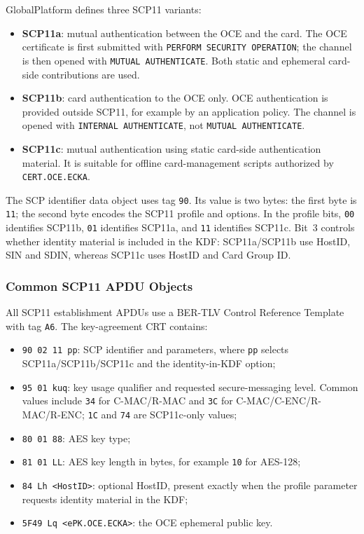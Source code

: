 GlobalPlatform defines three SCP11 variants:
\begin{itemize}
\item \textbf{SCP11a}: mutual authentication between the OCE and the card.
      The OCE certificate is first submitted with
      \texttt{PERFORM SECURITY OPERATION}; the channel is then opened with
      \texttt{MUTUAL AUTHENTICATE}. Both static and ephemeral card-side
      contributions are used.
\item \textbf{SCP11b}: card authentication to the OCE only. OCE
      authentication is provided outside SCP11, for example by an application
      policy. The channel is opened with \texttt{INTERNAL AUTHENTICATE}, not
      \texttt{MUTUAL AUTHENTICATE}.
\item \textbf{SCP11c}: mutual authentication using static card-side
      authentication material. It is suitable for offline card-management
      scripts authorized by \texttt{CERT.OCE.ECKA}.
\end{itemize}

The SCP identifier data object uses tag \texttt{90}. Its value is two bytes:
the first byte is \texttt{11}; the second byte encodes the SCP11 profile and
options. In the profile bits, \texttt{00} identifies SCP11b, \texttt{01}
identifies SCP11a, and \texttt{11} identifies SCP11c. Bit~3 controls whether
identity material is included in the KDF: SCP11a/SCP11b use HostID, SIN and
SDIN, whereas SCP11c uses HostID and Card Group ID.

\subsubsection{Common SCP11 APDU Objects}

All SCP11 establishment APDUs use a BER-TLV Control Reference Template with
tag \texttt{A6}. The key-agreement CRT contains:
\begin{itemize}
\item \texttt{90 02 11 pp}: SCP identifier and parameters, where
      \texttt{pp} selects SCP11a/SCP11b/SCP11c and the identity-in-KDF option;
\item \texttt{95 01 kuq}: key usage qualifier and requested secure-messaging
      level. Common values include \texttt{34} for C-MAC/R-MAC and
      \texttt{3C} for C-MAC/C-ENC/R-MAC/R-ENC; \texttt{1C} and \texttt{74}
      are SCP11c-only values;
\item \texttt{80 01 88}: AES key type;
\item \texttt{81 01 LL}: AES key length in bytes, for example
      \texttt{10} for AES-128;
\item \texttt{84 Lh <HostID>}: optional HostID, present exactly when the
      profile parameter requests identity material in the KDF;
\item \texttt{5F49 Lq <ePK.OCE.ECKA>}: the OCE ephemeral public key.
\end{itemize}

